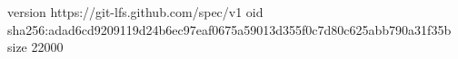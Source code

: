 version https://git-lfs.github.com/spec/v1
oid sha256:adad6cd9209119d24b6ec97eaf0675a59013d355f0c7d80c625abb790a31f35b
size 22000
